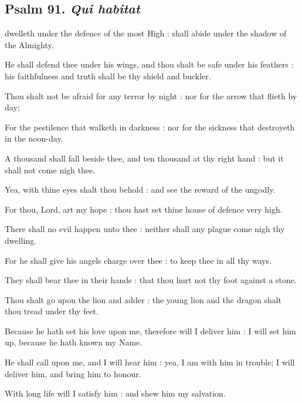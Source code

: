 \subsection{Psalm 91. \textit{Qui habitat}}

 dwelleth under the defence of the most High : shall abide under the shadow of the Almighty.\par
{}
He shall defend thee under his wings, and thou shalt be safe under his feathers : his faithfulness and truth shall be thy shield and buckler.\par
{}Thou shalt not be afraid for any terror by night : nor for the arrow that flieth by day;\par
{}For the pestilence that walketh in darkness : nor for the sickness that destroyeth in the noon-day.\par
{}A thousand shall fall beside thee, and ten thousand at thy right hand : but it shall not come nigh thee.\par
{}Yea, with thine eyes shalt thou behold : and see the reward of the ungodly.\par
{}For thou, Lord, art my hope : thou hast set thine house of defence very high.\par
{}There shall no evil happen unto thee : neither shall any plague come nigh thy dwelling.\par
{}For he shall give his angels charge over thee : to keep thee in all thy ways.\par
{}They shall bear thee in their hands : that thou hurt not thy foot against a stone.\par
{}Thou shalt go upon the lion and adder : the young lion and the dragon shalt thou tread under thy feet.\par
{}Because he hath set his love upon me, therefore will I deliver him : I will set him up, because he hath known my Name.\par
{}He shall call upon me, and I will hear him : yea, I am with him in trouble; I will deliver him, and bring him to honour.\par
{}With long life will I satisfy him : and shew him my salvation.\par

